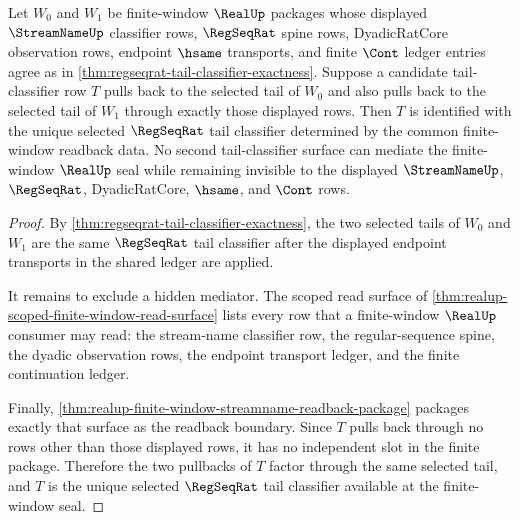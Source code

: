\begin{theorem}
\label{thm:regseqrat-tail-classifier-pullback-uniqueness}
Let $W_0$ and $W_1$ be finite-window $\RealUp$ packages whose displayed
$\StreamNameUp$ classifier rows, $\RegSeqRat$ spine rows, DyadicRatCore
observation rows, endpoint $\hsame$ transports, and finite $\Cont$ ledger
entries agree as in
\autoref{thm:regseqrat-tail-classifier-exactness}. Suppose a candidate
tail-classifier row $T$ pulls back to the selected tail of $W_0$ and also
pulls back to the selected tail of $W_1$ through exactly those displayed
rows. Then $T$ is identified with the unique selected $\RegSeqRat$ tail
classifier determined by the common finite-window readback data. No second
tail-classifier surface can mediate the finite-window $\RealUp$ seal while
remaining invisible to the displayed $\StreamNameUp$, $\RegSeqRat$,
DyadicRatCore, $\hsame$, and $\Cont$ rows.
\end{theorem}
\begin{proof}
By \autoref{thm:regseqrat-tail-classifier-exactness}, the two selected tails
of $W_0$ and $W_1$ are the same $\RegSeqRat$ tail classifier after the
displayed endpoint transports in the shared ledger are applied.

It remains to exclude a hidden mediator. The scoped read surface of
\autoref{thm:realup-scoped-finite-window-read-surface} lists every row that a
finite-window $\RealUp$ consumer may read: the stream-name classifier row, the
regular-sequence spine, the dyadic observation rows, the endpoint transport
ledger, and the finite continuation ledger.

Finally, \autoref{thm:realup-finite-window-streamname-readback-package}
packages exactly that surface as the readback boundary. Since $T$ pulls back
through no rows other than those displayed rows, it has no independent slot in
the finite package. Therefore the two pullbacks of $T$ factor through the
same selected tail, and $T$ is the unique selected $\RegSeqRat$ tail
classifier available at the finite-window seal.
\end{proof}

